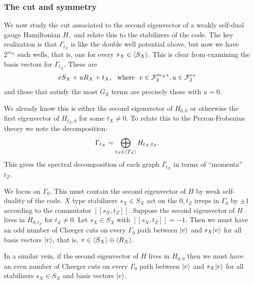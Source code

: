 

\subsubsection{The cut and symmetry}

We now study 
the cut associated to the second eigenvector of a 
weakly self-dual gauge Hamiltonian $H,$
and relate this to the stabilizers of the code.
The key realization is that $\Gamma_{t_X}$ is like
the double well potential above,
but now we have $2^{m_X}$ such wells,
that is, one for every $s_X\in \langle S_X \rangle.$
This is clear from examining the basis vectors for $\Gamma_{t_X}.$
These are 
$$
    v S_X + u R_X + t_X, \ \ \mbox{where}\ \  v\in \mathcal{F}_2^{m_X*}, u\in\mathcal{F}_2^{r*}
$$
and those that satisfy the most $G_Z$ terms are
precisely those with $u=0.$

We already know this is either the second eigenvector of $H_{0,0}$
or otherwise the first eigenvector of $H_{t_X,0}$ for some $t_X \ne 0.$
To relate this to the Perron-Frobenius theory we note the 
decomposition:
$$
    \Gamma_{t_X} = \bigoplus_{t_Z\in\langle T_Z \rangle} H_{t_X, t_Z}.
$$
This gives the spectral decomposition of each graph $\Gamma_{t_X}$ 
in terms of ``momenta'' $t_Z.$

We focus on $\Gamma_0.$
This must contain the second eigenvector of $H$ by weak self-duality of the code.
$X$ type stabilizers $s_X\in S_X$ act on the $0,t_Z$ irreps in $\Gamma_0$
by $\pm 1$ according to the commutator $[[s_X, t_Z]].$
Suppose the second eigenvector of $H$ lives in
$H_{0,t_Z}$ for $t_Z\ne 0$. 
Let $s_X\in S_X$ with $[[s_X, t_Z]]=-1.$
Then we must have an odd number of Cheeger cuts 
on every $\Gamma_0$ path between $|{v}\rangle$ and $s_X|{v}\rangle$ for all basis
vectors $|{v}\rangle,$ that is, $v\in\langle S_X \rangle\oplus\langle R_X \rangle.$

In a similar vein, if the second eigenvector of $H$ lives in $H_{0,0}$
then we must have an even number of Cheeger cuts 
on every $\Gamma_0$ path between $|{v}\rangle$ and $s_X|{v}\rangle$ for all stabilizers $s_X\in S_X$
and basis vectors $|{v}\rangle.$

